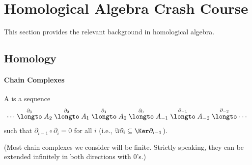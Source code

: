 \section{Homological Algebra Crash Course}
\label{sec:homological_algebra}
This section provides the relevant background in homological 
algebra.
\subsection{Homology}
\paragraph{Chain Complexes}
\begin{definition}
    A  is a sequence \[\cdots\stackrel{\partial_3}\longto A_2\stackrel{\partial_2}\longto A_1\stackrel{\partial_1}\longto A_0\stackrel{\partial_0}\longto A_{-1}\stackrel{\partial_{-1}}\longto A_{-2}\stackrel{\partial_{-2}}\longto\cdots\] such that $\partial_{i-1}\circ \partial_i = 0$ for all $i$ (i.e., $\Im \partial_i \subseteq \Ker \partial_{i-1}$).

    (Most chain complexes we consider will be finite. Strictly speaking, they can be extended infinitely in both directions with $0$'s.)
\end{definition}
